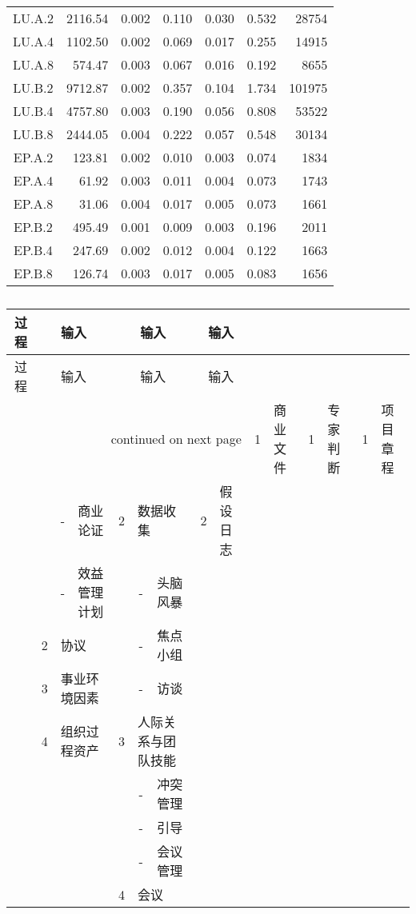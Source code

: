 \begin{longtable}[c]{c*{6}{r}}
LU.A.2 & 2116.54 & 0.002 & 0.110 & 0.030 & 0.532 & 28754 \\
LU.A.4 & 1102.50 & 0.002 & 0.069 & 0.017 & 0.255 & 14915 \\
LU.A.8 & 574.47 & 0.003 & 0.067 & 0.016 & 0.192 & 8655 \\
LU.B.2 & 9712.87 & 0.002 & 0.357 & 0.104 & 1.734 & 101975 \\
LU.B.4 & 4757.80 & 0.003 & 0.190 & 0.056 & 0.808 & 53522 \\
LU.B.8 & 2444.05 & 0.004 & 0.222 & 0.057 & 0.548 & 30134 \\
EP.A.2 & 123.81 & 0.002 & 0.010 & 0.003 & 0.074 & 1834 \\
EP.A.4 & 61.92 & 0.003 & 0.011 & 0.004 & 0.073 & 1743 \\
EP.A.8 & 31.06 & 0.004 & 0.017 & 0.005 & 0.073 & 1661 \\
EP.B.2 & 495.49 & 0.001 & 0.009 & 0.003 & 0.196 & 2011 \\
EP.B.4 & 247.69 & 0.002 & 0.012 & 0.004 & 0.122 & 1663 \\
EP.B.8 & 126.74 & 0.003 & 0.017 & 0.005 & 0.083 & 1656 \\
\bottomrule[1.5pt]
\end{longtable}


\begin{longtable}[c]{|c|p{0.1em}cl|p{0.1em}cl|p{0.1em}cl|}
\caption{}\label{table:}\\
\hline
过程 & \multicolumn{3}{c|}{输入} & \multicolumn{3}{c|}{输入} & \multicolumn{3}{c|}{输入}\\
\endfirsthead
\hline
过程 & \multicolumn{3}{c|}{输入} & \multicolumn{3}{c|}{输入} & \multicolumn{3}{c|}{输入}\\
\endhead
\multicolumn{10}{r}{continued on next page}
\endfoot
\endlastfoot
\hline
\multirow{10}*{\makecell[c]{\rotatebox{-90}{项目章程}}} & 1 & \multicolumn{2}{l|}{商业文件} & 1 & \multicolumn{2}{l|}{专家判断} & 1 & \multicolumn{2}{l|}{项目章程}\\\cline{2-10}
 &  & - & 商业论证 & 2 & \multicolumn{2}{l|}{数据收集} & 2 & \multicolumn{2}{l|}{假设日志}\\\cline{2-10}
 &  & - & 效益管理计划 &  & - & 头脑风暴 &  &  & \\\cline{2-7}
 & 2 & \multicolumn{2}{l|}{协议} &  & - & 焦点小组 &  &  & \\\cline{2-7}
 & 3 & \multicolumn{2}{l|}{事业环境因素} &  & - & 访谈 &  &  & \\\cline{2-7}
 & 4 & \multicolumn{2}{l|}{组织过程资产} & 3 & \multicolumn{2}{l|}{人际关系与团队技能} &  &  & \\\cline{2-7}
 &  &  &  &  & - & 冲突管理 &  &  & \\\cline{5-7}
 &  &  &  &  & - & 引导 &  &  & \\\cline{5-7}
 &  &  &  &  & - & 会议管理 &  &  & \\\cline{5-7}
 &  &  &  & 4 & \multicolumn{2}{l|}{会议} &  &  & \\
\hline
\end{longtable}

